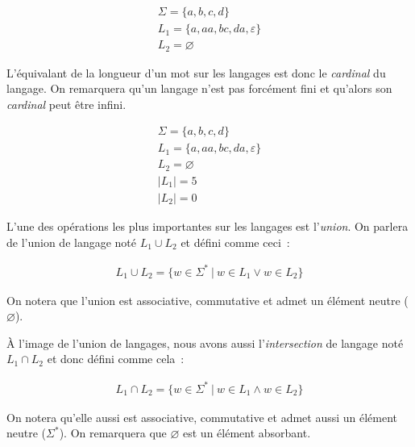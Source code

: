 \begin{example}
    \begin{gather*}
        \Sigma = \{a, b, c, d\} \\
        L_1 = \{a, aa, bc, da, \varepsilon\} \\
        L_2 = \varnothing
    \end{gather*}
\end{example}

\begin{definition}
    L'équivalant de la longueur d'un mot sur les langages est donc le
    \textit{cardinal} du langage. On remarquera qu'un langage n'est pas forcément
    fini et qu'alors son \textit{cardinal} peut être infini.
\end{definition}

\begin{example}
    \begin{gather*}
        \Sigma = \{a, b, c, d\} \\
        L_1 = \{a, aa, bc, da, \varepsilon\} \\
        L_2 = \varnothing \\
        | L_1 | = 5 \\
        | L_2 | = 0
    \end{gather*}
\end{example}

\begin{definition}
    L'une des opérations les plus importantes sur les langages est
    l'\textit{union}. On parlera de l'union de langage noté \(L_1 \cup L_2\) et
    défini comme ceci~:

    \begin{gather*}
        L_1 \cup L_2 = \{w \in \Sigma ^ * ~|~ w \in L_1 \lor w \in L_2\}
    \end{gather*}

    \noindent On notera que l'union est associative, commutative et admet un
    élément neutre (\(\varnothing\)).
\end{definition}

\begin{definition}
    À l'image de l'union de langages, nous avons aussi l'\textit{intersection} de
    langage noté \(L_1 \cap L_2\) et donc défini comme cela~:

    \begin{gather*}
        L_1 \cap L_2 = \{w \in \Sigma ^ * ~|~ w \in L_1 \land w \in L_2\}
    \end{gather*}

    \noindent On notera qu'elle aussi est associative, commutative et admet
    aussi un élément neutre (\(\Sigma ^ *\)). On remarquera que \(\varnothing\) est
    un élément absorbant.
\end{definition}


